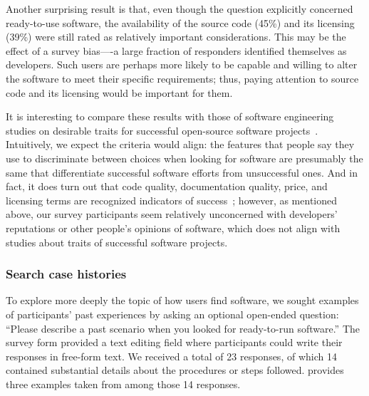 \documentclass{casicswhitepaper}
\begin{document}
Another surprising result is that, even though the question explicitly concerned ready-to-use software, the availability of the source code (45\%) and its licensing (39\%) were still rated as relatively important considerations. This may be the effect of a survey bias----a large fraction of responders identified themselves as developers. Such users are perhaps more likely to be capable and willing to alter the software to meet their specific requirements; thus, paying attention to source code and its licensing would be important for them.

It is interesting to compare these results with those of software engineering studies on desirable traits for successful open-source software projects~\cite[e.g.,][]{subramaniam2009determinants, crowston2003defining, crowston2006information, sen2012open, lee2009measuring}.  Intuitively, we expect the criteria would align: the features that people say they use to discriminate between choices when looking for software are presumably the same that differentiate successful software efforts from unsuccessful ones.  And in fact, it does turn out that code quality, documentation quality, price, and licensing terms are recognized indicators of success~\cite{subramaniam2009determinants, crowston2003defining}; however, as mentioned above, our survey participants seem relatively unconcerned with developers' reputations or other people's opinions of software, which does not align with studies about traits of successful software projects.


\subsubsection{Search case histories}

To explore more deeply the topic of how users find software, we sought examples of participants' past experiences by asking an optional open-ended question: ``Please describe a past scenario when you looked for ready-to-run software.''  The survey form provided a text editing field where participants could write their responses in free-form text.  We received a total of 23 responses, of which 14 contained substantial details about the procedures or steps followed.   provides three examples taken from among those 14 responses.
\end{document}
